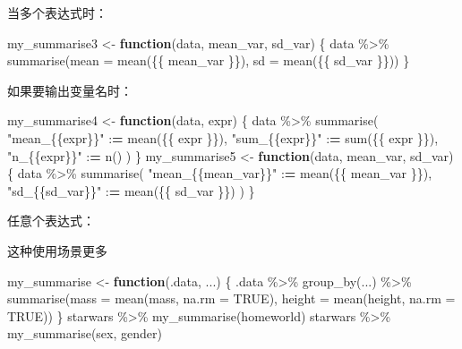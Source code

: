 \documentclass[
]{book}
\newenvironment{Shaded}{\begin{snugshade}}{\end{snugshade}}
\newcommand{\AttributeTok}[1]{\textcolor[rgb]{0.77,0.63,0.00}{#1}}
\newcommand{\ConstantTok}[1]{\textcolor[rgb]{0.00,0.00,0.00}{#1}}
\newcommand{\ControlFlowTok}[1]{\textcolor[rgb]{0.13,0.29,0.53}{\textbf{#1}}}
\newcommand{\ErrorTok}[1]{\textcolor[rgb]{0.64,0.00,0.00}{\textbf{#1}}}
\newcommand{\FunctionTok}[1]{\textcolor[rgb]{0.00,0.00,0.00}{#1}}
\newcommand{\NormalTok}[1]{#1}
\newcommand{\OtherTok}[1]{\textcolor[rgb]{0.56,0.35,0.01}{#1}}
\newcommand{\SpecialCharTok}[1]{\textcolor[rgb]{0.00,0.00,0.00}{#1}}
\newcommand{\StringTok}[1]{\textcolor[rgb]{0.31,0.60,0.02}{#1}}
\begin{document}
当多个表达式时：

\begin{Shaded}
\begin{Highlighting}[]
\NormalTok{my\_summarise3 }\OtherTok{\textless{}{-}} \ControlFlowTok{function}\NormalTok{(data, mean\_var, sd\_var) \{}
\NormalTok{  data }\SpecialCharTok{\%\textgreater{}\%} 
    \FunctionTok{summarise}\NormalTok{(}\AttributeTok{mean =} \FunctionTok{mean}\NormalTok{(\{\{ mean\_var \}\}), }\AttributeTok{sd =} \FunctionTok{mean}\NormalTok{(\{\{ sd\_var \}\}))}
\NormalTok{\}}
\end{Highlighting}
\end{Shaded}

如果要输出变量名时：

\begin{Shaded}
\begin{Highlighting}[]
\NormalTok{my\_summarise4 }\OtherTok{\textless{}{-}} \ControlFlowTok{function}\NormalTok{(data, expr) \{}
\NormalTok{  data }\SpecialCharTok{\%\textgreater{}\%} \FunctionTok{summarise}\NormalTok{(}
    \StringTok{"mean\_\{\{expr\}\}"} \SpecialCharTok{:}\ErrorTok{=} \FunctionTok{mean}\NormalTok{(\{\{ expr \}\}),}
    \StringTok{"sum\_\{\{expr\}\}"} \SpecialCharTok{:}\ErrorTok{=} \FunctionTok{sum}\NormalTok{(\{\{ expr \}\}),}
    \StringTok{"n\_\{\{expr\}\}"} \SpecialCharTok{:}\ErrorTok{=} \FunctionTok{n}\NormalTok{()}
\NormalTok{  )}
\NormalTok{\}}
\NormalTok{my\_summarise5 }\OtherTok{\textless{}{-}} \ControlFlowTok{function}\NormalTok{(data, mean\_var, sd\_var) \{}
\NormalTok{  data }\SpecialCharTok{\%\textgreater{}\%} 
    \FunctionTok{summarise}\NormalTok{(}
      \StringTok{"mean\_\{\{mean\_var\}\}"} \SpecialCharTok{:}\ErrorTok{=} \FunctionTok{mean}\NormalTok{(\{\{ mean\_var \}\}), }
      \StringTok{"sd\_\{\{sd\_var\}\}"} \SpecialCharTok{:}\ErrorTok{=} \FunctionTok{mean}\NormalTok{(\{\{ sd\_var \}\})}
\NormalTok{    )}
\NormalTok{\}}
\end{Highlighting}
\end{Shaded}

任意个表达式：

这种使用场景更多

\begin{Shaded}
\begin{Highlighting}[]
\NormalTok{my\_summarise }\OtherTok{\textless{}{-}} \ControlFlowTok{function}\NormalTok{(.data, ...) \{}
\NormalTok{  .data }\SpecialCharTok{\%\textgreater{}\%}
    \FunctionTok{group\_by}\NormalTok{(...) }\SpecialCharTok{\%\textgreater{}\%}
    \FunctionTok{summarise}\NormalTok{(}\AttributeTok{mass =} \FunctionTok{mean}\NormalTok{(mass, }\AttributeTok{na.rm =} \ConstantTok{TRUE}\NormalTok{), }\AttributeTok{height =} \FunctionTok{mean}\NormalTok{(height, }\AttributeTok{na.rm =} \ConstantTok{TRUE}\NormalTok{))}
\NormalTok{\}}
\NormalTok{starwars }\SpecialCharTok{\%\textgreater{}\%} \FunctionTok{my\_summarise}\NormalTok{(homeworld)}
\NormalTok{starwars }\SpecialCharTok{\%\textgreater{}\%} \FunctionTok{my\_summarise}\NormalTok{(sex, gender)}
\end{Highlighting}
\end{Shaded}
\end{document}
